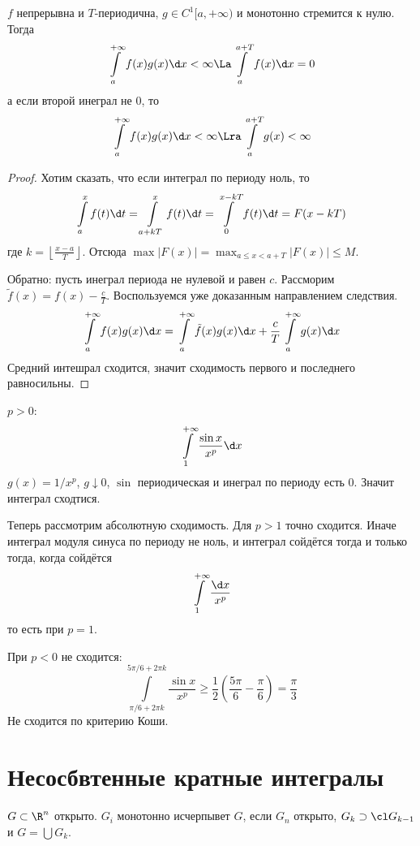 \begin{conseq}
	$f$ непрерывна и $T$-периодична, $g \in C^1[a, +\infty)$ и монотонно стремится к нулю.
	Тогда
	\[ \int\limits_a^{+\infty} f(x) g(x) \d x < \infty \La \int\limits_a^{a+T} f(x) \d x = 0 \]
	а если второй инеграл не 0, то
	\[ \int\limits_a^{+\infty} f(x) g(x) \d x < \infty \Lra \int\limits_a^{a+T} g(x) < \infty \]
\end{conseq}

\begin{proof}
	Хотим сказать, что если интеграл по периоду ноль, то
	\[ \int\limits_a^x f(t) \d t = \int\limits_{a+kT}^x f(t) \d t = \int\limits_0^{x-kT} f(t) \d t = F(x - kT) \]
	где $k = \left\lfloor \frac{x - a}T \right\rfloor$.
	Отсюда $\max |F(x)| = \max_{a \le x < a + T} |F(x)| \le M$.

	Обратно: пусть инеграл периода не нулевой и равен $c$.
	Рассморим $\tilde f(x) = f(x) - \frac{c}T$.
	Воспользуемся уже доказанным направлением следствия.
	\[ \int\limits_a^{+\infty} f(x) g(x) \d x = \int\limits_a^{+\infty} \tilde f(x) g(x) \d x + \frac{c}T \int\limits_a^{+\infty} g(x) \d x \]
	Средний интешрал сходится, значит сходимость первого и последнего равносильны.
\end{proof}

\begin{exmp}
	$p > 0$:
	\[ \int\limits_1^{+\infty} \frac{\sin x}{x^p} \d x \]
	$g(x) = 1 / x^p$, $g \downarrow 0$, $\sin$ периодическая и инеграл по периоду есть 0.
	Значит интеграл сходтися.

	Теперь рассмотрим абсолютную сходимость.
	Для $p > 1$ точно сходится.
	Иначе интеграл модуля синуса по периоду не ноль, и интеграл сойдётся тогда и только тогда, когда сойдётся
	\[ \int\limits_1^{+\infty} \frac{\d x}{x^p} \]
	то есть при $p = 1$.

	При $p < 0$ не сходится:
	\[ \int\limits_{\pi/6+2\pi k}^{5 \pi/6 + 2\pi k} \frac{\sin x}{x^p} \ge \frac12 (\frac{5\pi}6 - \frac\pi6) = \frac\pi3 \]
	Не сходится по критерию Коши.
\end{exmp}

\section{Несосбвтенные кратные интегралы}

\begin{Def}
	$G \subset \R^n$ открыто.
	${G_i}$ монотонно исчерпывет $G$, если $G_n$ открыто, $G_k \supset \cl G_{k-1}$ и $G = \bigcup G_k$.
\end{Def}

